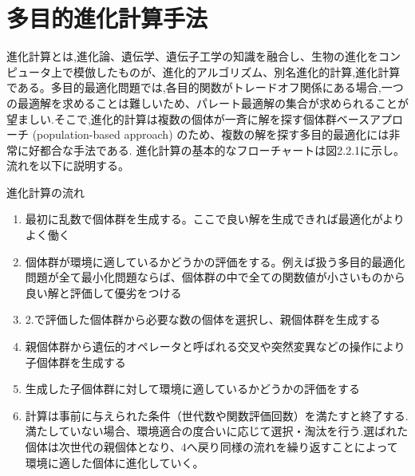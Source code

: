 \documentclass[11pt,a4j,notitlepage]{jreport}
\begin{document}
\section{多目的進化計算手法}
進化計算とは,進化論、遺伝学、遺伝子工学の知識を融合し、生物の進化をコンピュータ上で模倣したものが、進化的アルゴリズム、別名進化的計算,進化計算である。多目的最適化問題では,各目的関数がトレードオフ関係にある場合,一つの最適解を求めることは難しいため、パレート最適解の集合が求められることが望ましい.そこで,進化的計算は複数の個体が一斉に解を探す個体群ベースアプローチ (population-based approach) のため、複数の解を探す多目的最適化には非常に好都合な手法である.
進化計算の基本的なフローチャートは図2.2.1に示し。流れを以下に説明する。

\begin{itembox}[l]{進化計算の流れ}
\begin{enumerate}
  \item 最初に乱数で個体群を生成する。ここで良い解を生成できれば最適化がよりよく働く
  \item 個体群が環境に適しているかどうかの評価をする。例えば扱う多目的最適化問題が全て最小化問題ならば、個体群の中で全ての関数値が小さいものから良い解と評価して優劣をつける
  \item 2.で評価した個体群から必要な数の個体を選択し、親個体群を生成する
  \item 親個体群から遺伝的オペレータと呼ばれる交叉や突然変異などの操作により子個体群を生成する
  \item 生成した子個体群に対して環境に適しているかどうかの評価をする
  \item 計算は事前に与えられた条件（世代数や関数評価回数）を満たすと終了する.満たしていない場合、環境適合の度合いに応じて選択・淘汰を行う.選ばれた個体は次世代の親個体となり、4へ戻り同様の流れを繰り返すことによって環境に適した個体に進化していく。
\end{enumerate}
\end{itembox}
\end{document}

